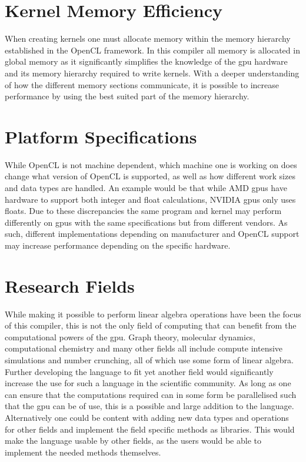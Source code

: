 \section{Kernel Memory Efficiency}
When creating kernels one must allocate memory within the memory hierarchy established in the OpenCL framework.
In this compiler all memory is allocated in global memory as it significantly simplifies the knowledge of the \acrshort{gpu} hardware and its memory hierarchy required to write kernels.
With a deeper understanding of how the different memory sections communicate, it is possible to increase performance by using the best suited part of the memory hierarchy. \citep{ocl_lecture3}

\section{Platform Specifications}
While OpenCL is not machine dependent, which machine one is working on does change what version of OpenCL is supported, as well as how different work sizes and data types are handled.
An example would be that while AMD \acrshort{gpu}s have hardware to support both integer and float calculations, NVIDIA \acrshort{gpu}s only uses floats. \citep{CUDAOpenCLOptimisation}
Due to these discrepancies the same program and kernel may perform differently on \acrshort{gpu}s with the same specifications but from different vendors.
As such, different implementations depending on manufacturer and OpenCL support may increase performance depending on the specific hardware.

\section{Research Fields}
While making it possible to perform linear algebra operations have been the focus of this compiler, this is not the only field of computing that can benefit from the computational powers of the \acrshort{gpu}.
Graph theory, molecular dynamics, computational chemistry and many other fields all include compute intensive simulations and number crunching, all of which use some form of linear algebra.
Further developing the language to fit yet another field would significantly increase the use for such a language in the scientific community.
As long as one can ensure that the computations required can in some form be parallelised such that the \acrshort{gpu} can be of use, this is a possible and large addition to the language.
Alternatively one could be content with adding new data types and operations for other fields and implement the field specific methods as libraries.
This would make the language usable by other fields, as the users would be able to implement the needed methods themselves.

